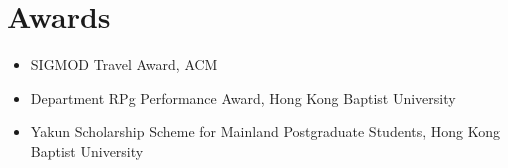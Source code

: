 \documentclass{mycv}
\begin{document}
\section{Awards}

\begin{itemize}
  \item SIGMOD Travel Award, ACM 
  \item Department RPg Performance Award, Hong Kong Baptist University 
  \item Yakun Scholarship Scheme for Mainland Postgraduate Students, Hong Kong Baptist University 
\end{itemize}
\end{document}
